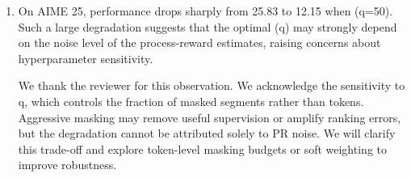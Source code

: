 \begin{enumerate}
\begin{responsebox}[frametitle={Response to W2}]
Also, to assess generalization to a larger, non-Qwen setting, we added an 8B Llama-based model pair (DeepSeek-R1-Distill-Llama-8B and Llama-3.1-Nemotron-Nano-8B-v1), with a 32k evaluation limit for all methods. R²-OPD improves four-benchmark mean Avg@4/pass@4 over OPD by 1.94/2.95 percentage points. On Olympiad and GPQA, the respective gains are 5.27/3.41 and 1.64/5.05 points. Pass@4 improves or ties on all four benchmarks; Avg@4 improves on three, with a 1.67-point decrease on AIME25. These results provide additional evidence that our method extends beyond the original Qwen-based settings.




\vspace*{2\baselineskip}
\end{responsebox}

\item On AIME 25, performance drops sharply from 25.83 to 12.15 when (q=50). Such a large degradation suggests that the optimal (q) may strongly depend on the noise level of the process-reward estimates, raising concerns about hyperparameter sensitivity.
\par{}
\begin{responsebox}[frametitle={Response to W3}]
We thank the reviewer for this observation. We acknowledge the sensitivity to q, which controls the fraction of masked segments rather than tokens. Aggressive masking may remove useful supervision or amplify ranking errors, but the degradation cannot be attributed solely to PR noise. We will clarify this trade-off and explore token-level masking budgets or soft weighting to improve robustness.
\end{responsebox}


\end{enumerate}
